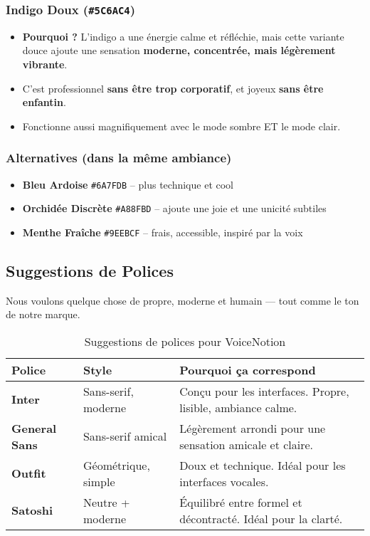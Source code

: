 \subsubsection{Indigo Doux (\texttt{\#5C6AC4})}

\begin{itemize}
    \item \textbf{Pourquoi ?} L'indigo a une énergie calme et réfléchie, mais cette variante douce ajoute une sensation \textbf{moderne, concentrée, mais légèrement vibrante}.
    \item C'est professionnel \textbf{sans être trop corporatif}, et joyeux \textbf{sans être enfantin}.
    \item Fonctionne aussi magnifiquement avec le mode sombre ET le mode clair.
\end{itemize}

\subsubsection{Alternatives (dans la même ambiance)}

\begin{itemize}
    \item \textbf{Bleu Ardoise} \texttt{\#6A7FDB} – plus technique et cool
    \item \textbf{Orchidée Discrète} \texttt{\#A88FBD} – ajoute une joie et une unicité subtiles
    \item \textbf{Menthe Fraîche} \texttt{\#9EEBCF} – frais, accessible, inspiré par la voix
\end{itemize}

\subsection{Suggestions de Polices}

Nous voulons quelque chose de propre, moderne et humain — tout comme le ton de notre marque.

\begin{table}[H]
    \centering
    \begin{tabular}{|p{3cm}|p{3cm}|p{7cm}|}
        \hline
        \textbf{Police} & \textbf{Style} & \textbf{Pourquoi ça correspond} \\
        \hline
        \textbf{Inter} & Sans-serif, moderne & Conçu pour les interfaces. Propre, lisible, ambiance calme. \\
        \hline
        \textbf{General Sans} & Sans-serif amical & Légèrement arrondi pour une sensation amicale et claire. \\
        \hline
        \textbf{Outfit} & Géométrique, simple & Doux et technique. Idéal pour les interfaces vocales. \\
        \hline
        \textbf{Satoshi} & Neutre + moderne & Équilibré entre formel et décontracté. Idéal pour la clarté. \\
        \hline
    \end{tabular}
    \caption{Suggestions de polices pour VoiceNotion}
    \label{tab:font_suggestions}
\end{table}

